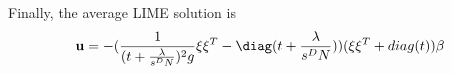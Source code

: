     Finally, the average LIME solution is 
    \begin{equation*}
        \mathbf{u} = -(\frac{1}{(t + \frac{\lambda}{s^D N})^2g} \xi \xi^T - \diag(t + \frac{\lambda}{s^D N}))(\xi \xi^T + diag(t)) \beta
    \end{equation*}

